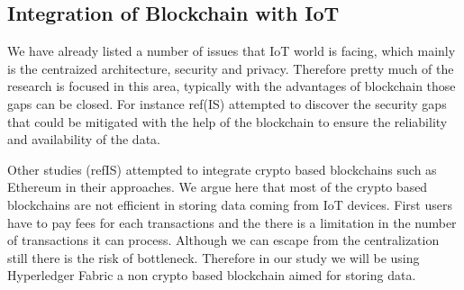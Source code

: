 \subsection{Integration of Blockchain with IoT}

We have already listed a number of issues that IoT world is facing, which mainly is the centraized architecture, security and privacy. Therefore pretty much of the research is focused in this area, typically with the advantages of blockchain those gaps can be closed. For instance ref(IS) attempted to discover the security gaps that could be mitigated with the help of the blockchain to ensure the reliability and availability of the data.

Other studies (refIS) attempted to integrate crypto based blockchains such as Ethereum in their approaches. We argue here that most of the crypto based blockchains are not efficient in storing data coming from IoT devices. First users have to pay fees for each transactions and the there is a limitation in the number of transactions it can process. Although we can escape from the centralization still there is the risk of bottleneck. Therefore in our study we will be using Hyperledger Fabric a non crypto based blockchain aimed for storing data. 


































